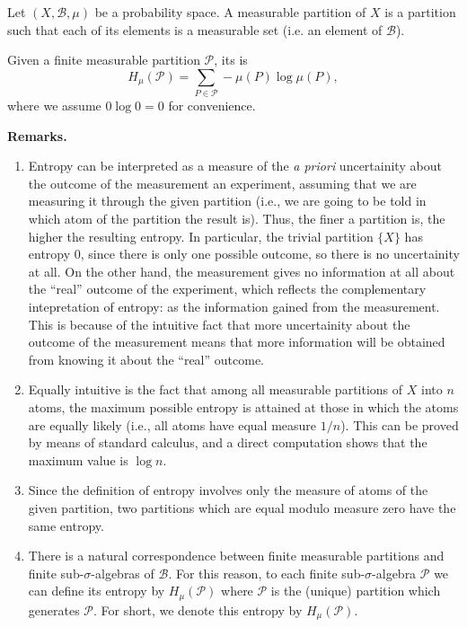 \documentclass[12pt]{article}
\begin{document}
Let $(X,\mathscr{B},\mu)$ be a probability space. A measurable partition of $X$ is a partition such that each of its
elements is a measurable set (i.e. an element of $\mathscr{B}$).

Given a finite measurable partition $\mathcal{P}$,
its \emph{} is
\[ H_\mu(\mathcal{P})=\sum_{P\in\mathcal{P}} -\mu(P)\log\mu(P),\]
where we assume $0\log 0 = 0$ for convenience.

\textbf{Remarks.}
\begin{enumerate}
        \item   Entropy can be interpreted as a measure of the \textit{a priori} uncertainity about the
                outcome of the measurement an experiment, assuming that we are measuring it through the given partition
                (i.e., we are going to be told in which atom of the partition the result is).
                Thus, the finer a partition is, the higher the resulting entropy. In particular, the trivial
                partition $\{X\}$ has entropy $0$, since there is only one possible outcome, so there is no
                uncertainity at all. On the other hand, the measurement gives no information at all
                about the ``real'' outcome of the experiment, which reflects the complementary intepretation of entropy:
                as the information gained from the measurement.
                This is because of the intuitive fact that more
                uncertainity about the outcome of the measurement means that more information will be obtained from
                knowing it about the ``real'' outcome.


        \item   Equally intuitive is the fact that among all measurable partitions of $X$ into $n$ atoms, the maximum
                possible
                entropy is attained at those in which the atoms are equally likely (i.e., all atoms have equal
                measure $1/n$).
                This can be proved by means of standard calculus, and
                a direct computation shows that the maximum value is $\log n$.

       \item   Since the definition of entropy involves only the measure of atoms of the given partition, two
                partitions which are equal modulo measure zero have the same entropy.
       \item There is a natural correspondence between finite measurable partitions and finite sub-$\sigma$-algebras of $\mathscr{B}$. For this reason,
to each finite sub-$\sigma$-algebra $\mathscr{P}$ we can define its entropy by $H_\mu(\mathcal{P})$ where $\mathcal{P}$ is the (unique) partition which generates $\mathscr{P}$. For short, we denote this entropy by $H_\mu(\mathscr{P})$.
\end{enumerate}
\end{document}
